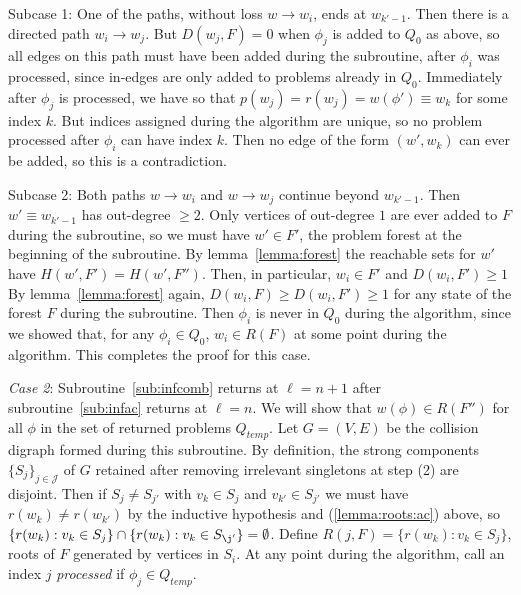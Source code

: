 \documentclass[11pt,reqno]{amsart}
\theoremstyle{definition}
\numberwithin{equation}{section}
\newcommand{\pre}{\phi}
\newcommand{\strongcomp}{S}
\newcommand{\acto}{Q_0}
\newcommand{\actt}{Q_{temp}}
\newcommand{\reach}{H}
\newcommand{\forest}{F}
\newcommand{\roott}{R}
\newcommand{\depth}{D}
\newcommand{\infcombgraphii}{(2)\xspace}
\begin{document}
Subcase 1: One of the paths, without loss $w \to w_i$, ends at $w_{k'-1}$. 
Then there is a directed path $w_i \to w_j$.
But $\depth(w_j, \forest) = 0$ when $\pre_j$ is added to $\acto$ as above, so all edges on this path must have been added during the subroutine, after $\pre_i$ was processed, since in-edges are only added to problems already in $\acto$.
Immediately after $\pre_j$ is processed, we have so that $p(w_j) = r(w_j) = w(\pre') \equiv w_k$ for some index $k$.
But indices assigned during the algorithm are unique, so no problem processed after $\pre_i$ can have index $k$.
Then no edge of the form $(w',w_k)$ can ever be added, so this is a contradiction.

Subcase 2: Both paths $w \to w_i$ and $w \to w_j$ continue beyond $w_{k'-1}$.
Then $w' \equiv w_{k' - 1}$ has out-degree $\geq 2$.
Only vertices of out-degree $1$ are ever added to $\forest$ during the subroutine, so we must have $w' \in \forest'$, the problem forest at the beginning of the subroutine.
By lemma~\ref{lemma:forest} the reachable sets for $w'$ have $\reach(w',\forest') = \reach(w',\forest'')$.  
Then, in particular, $w_i \in \forest'$ and $\depth(w_i, \forest') \geq 1$
By lemma~\ref{lemma:forest} again, $\depth(w_i, \forest) \geq \depth(w_i, \forest') \geq 1$  for any state of the forest $\forest$ during the subroutine. 
Then $\pre_i$ is never in $\acto$ during the algorithm, since we showed that, for any $\pre_i \in \acto$, $w_i \in \roott(\forest)$ at some point during the algorithm. 
This completes the proof for this case.

\emph{Case 2}: Subroutine~\ref{sub:infcomb} returns at $\ell = n +1$ after subroutine~\ref{sub:infac} returns at $\ell = n$. 
We will show that $w(\pre) \in \roott(\forest'')$ for all $\pre$ in the set of returned problems $\actt$.
Let $G = (V,E)$ be the collision digraph formed during this subroutine.
By definition, the strong components $\{\strongcomp_j\}_{j \in \mathcal{J}}$ of $G$ retained after removing irrelevant singletons at step \infcombgraphii are disjoint. 
Then if $\strongcomp_j \not = \strongcomp_{j'}$ with $v_k \in \strongcomp_j$ and $v_{k'} \in \strongcomp_{j'}$ we must have $r(w_k) \not = r(w_{k'})$ by the inductive hypothesis and (\ref{lemma:roots:ac}) above, so $\{r(w_k): v_k \in \strongcomp_j\} \cap \{r(w_k): v_k \in \strongcomp_{\j'}\} = \emptyset$. 
Define $R(j,\forest) = \{r(w_k): v_k \in \strongcomp_j\}$, roots of $\forest$ generated by vertices in $\strongcomp_i$. 
At any point during the algorithm, call an index $j$ \emph{processed} if $\pre_j \in \actt$.
\end{document}
